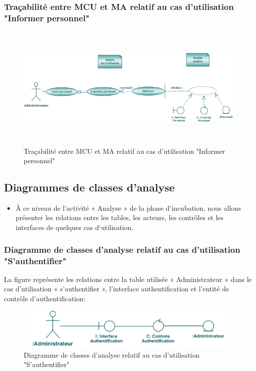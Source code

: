 \documentclass[12 pt]{report}
\begin{document}
\subsubsection{Traçabilité entre MCU et MA relatif au cas d’utilisation "Informer personnel" }
\begin{figure}[h]
\begin{center}
\includegraphics[width= 14cm , height =6cm]{tra_info_per.png}
\caption{Traçabilité entre MCU et MA relatif au cas d’utilisation "Informer personnel"}
\end{center}
\end{figure}
\newpage
\subsection{Diagrammes de classes d'analyse}
\begin{itemize}[font=\color{black} \Large, label=] 
\item À ce niveau de l’activité « Analyse » de la phase d’incubation, nous allons présenter les relations entre les tables, les acteurs, les contrôles et les interfaces de quelques cas d‘utilisation.
\end{itemize}
\subsubsection{Diagramme de classes d’analyse relatif au cas d’utilisation "S’authentifier" }
La figure  représente les relations entre la table utilisée « Administrateur » dans le cas d’utilisation « s'authentifier », l’interface  authentification et  l'entité de  contrôle d'authentification:
\begin{figure}[h]
\begin{center}
\includegraphics[width= 12cm , height =2cm]{classid.png}
\caption{Diagramme de classes d’analyse relatif au cas d’utilisation "S’authentifier"}
\end{center}
\end{figure}
\end{document}
